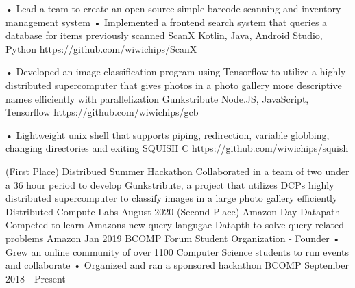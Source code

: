 \documentclass[]{awesome-cv}
\begin{document}
\vspace{-7mm}
\begin{cventries}
	\cventry
	{• Lead a team to create an open source simple barcode scanning and inventory management system • Implemented a frontend search system that queries a database for items previously scanned}
	{ScanX}
	{Kotlin, Java, Android Studio, Python}
	{https://github.com/wiwichips/ScanX}
	{}
	
	\vspace{-5mm}
	\cventry
	{• Developed an image classification program using Tensorflow to utilize a highly distributed supercomputer that gives photos in a photo gallery more descriptive names efficiently with parallelization}
	{Gunkstribute}
	{Node.JS, JavaScript, Tensorflow}
	{https://github.com/wiwichips/gcb}
	{}
	
	\vspace{-5mm}
	\cventry
	{• Lightweight unix shell that supports piping, redirection, variable globbing, changing directories and exiting}
	{SQUISH}
	{C}
	{https://github.com/wiwichips/squish}
	{}
	
	\vspace{-5mm}
\end{cventries}
\begin{cvhonors}
	\cvhonor
	{(First Place) Distribued Summer Hackathon}
	{Collaborated in a team of two under a 36 hour period to develop Gunkstribute, a project that utilizes DCP\textquotesingle{}s highly distributed supercomputer to classify images in a large photo gallery efficiently}
	{Distributed Compute Labs}
	{August 2020}
	\cvhonor
	{(Second Place) Amazon Day Datapath}
	{Competed to learn Amazon\textquotesingle{}s new query langugae Datapth to solve query related problems}
	{Amazon}
	{Jan 2019}
	\cvhonor
	{BCOMP Forum Student Organization - Founder}
	{• Grew an online community of over 1100 Computer Science students to run events and collaborate • Organized and ran a sponsored hackathon}
	{BCOMP}
	{September 2018 - Present}
\end{cvhonors}
\ 
\end{document}
